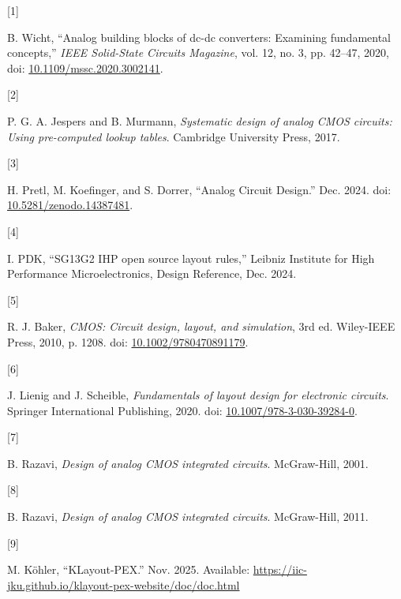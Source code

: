 \documentclass[
  11pt,
  a4paper,
  oneside]{scrbook}
\newlength{\cslhangindent}
\newlength{\csllabelwidth}
\newenvironment{CSLReferences}[2] %
 {\begin{list}{}{%
  \setlength{\itemindent}{0pt}
  \setlength{\leftmargin}{0pt}
  \setlength{\parsep}{0pt}
  \ifodd #1
   \setlength{\leftmargin}{\cslhangindent}
   \setlength{\itemindent}{-1\cslhangindent}
  \fi
  \setlength{\itemsep}{#2\baselineskip}}}
 {\end{list}}
\newcommand{\CSLLeftMargin}[1]{\parbox[t]{\csllabelwidth}{\strut#1\strut}}
\newcommand{\CSLRightInline}[1]{\parbox[t]{\linewidth - \csllabelwidth}{\strut#1\strut}}
\begin{document}
\label{refs}
\begin{CSLReferences}{0}{0}
\CSLLeftMargin{{[}1{]} }%
\CSLRightInline{B. Wicht, {``Analog building blocks of dc-dc converters:
Examining fundamental concepts,''} \emph{{IEEE} Solid-State Circuits
Magazine}, vol. 12, no. 3, pp. 42--47, 2020, doi:
\href{https://doi.org/10.1109/mssc.2020.3002141}{10.1109/mssc.2020.3002141}.}

\CSLLeftMargin{{[}2{]} }%
\CSLRightInline{P. G. A. Jespers and B. Murmann, \emph{Systematic design
of analog CMOS circuits: Using pre-computed lookup tables}. Cambridge
University Press, 2017.}

\CSLLeftMargin{{[}3{]} }%
\CSLRightInline{H. Pretl, M. Koefinger, and S. Dorrer, {``Analog
{Circuit} {Design}.''} Dec. 2024. doi:
\href{https://doi.org/10.5281/zenodo.14387481}{10.5281/zenodo.14387481}.}

\CSLLeftMargin{{[}4{]} }%
\CSLRightInline{I. PDK, {``SG13G2 IHP open source layout rules,''}
Leibniz Institute for High Performance Microelectronics, Design
Reference, Dec. 2024.}

\CSLLeftMargin{{[}5{]} }%
\CSLRightInline{R. J. Baker, \emph{{CMOS}: Circuit design, layout, and
simulation}, 3rd ed. Wiley-IEEE Press, 2010, p. 1208. doi:
\href{https://doi.org/10.1002/9780470891179}{10.1002/9780470891179}.}

\CSLLeftMargin{{[}6{]} }%
\CSLRightInline{J. Lienig and J. Scheible, \emph{Fundamentals of layout
design for electronic circuits}. Springer International Publishing,
2020. doi:
\href{https://doi.org/10.1007/978-3-030-39284-0}{10.1007/978-3-030-39284-0}.}

\CSLLeftMargin{{[}7{]} }%
\CSLRightInline{B. Razavi, \emph{Design of analog CMOS integrated
circuits}. McGraw-Hill, 2001.}

\CSLLeftMargin{{[}8{]} }%
\CSLRightInline{B. Razavi, \emph{Design of analog CMOS integrated
circuits}. McGraw-Hill, 2011.}

\CSLLeftMargin{{[}9{]} }%
\CSLRightInline{M. Köhler, {``KLayout-PEX.''} Nov. 2025. Available:
\url{https://iic-jku.github.io/klayout-pex-website/doc/doc.html}}

\end{CSLReferences}
\end{document}
